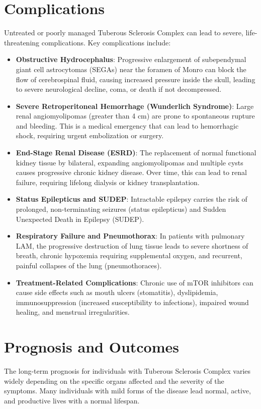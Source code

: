 \section*{Complications}
Untreated or poorly managed Tuberous Sclerosis Complex can lead to severe, life-threatening complications. Key complications include:
\begin{itemize}
    \item \textbf{Obstructive Hydrocephalus}: Progressive enlargement of subependymal giant cell astrocytomas (SEGAs) near the foramen of Monro can block the flow of cerebrospinal fluid, causing increased pressure inside the skull, leading to severe neurological decline, coma, or death if not decompressed.
    \item \textbf{Severe Retroperitoneal Hemorrhage (Wunderlich Syndrome)}: Large renal angiomyolipomas (greater than 4 cm) are prone to spontaneous rupture and bleeding. This is a medical emergency that can lead to hemorrhagic shock, requiring urgent embolization or surgery.
    \item \textbf{End-Stage Renal Disease (ESRD)}: The replacement of normal functional kidney tissue by bilateral, expanding angiomyolipomas and multiple cysts causes progressive chronic kidney disease. Over time, this can lead to renal failure, requiring lifelong dialysis or kidney transplantation.
    \item \textbf{Status Epilepticus and SUDEP}: Intractable epilepsy carries the risk of prolonged, non-terminating seizures (status epilepticus) and Sudden Unexpected Death in Epilepsy (SUDEP).
    \item \textbf{Respiratory Failure and Pneumothorax}: In patients with pulmonary LAM, the progressive destruction of lung tissue leads to severe shortness of breath, chronic hypoxemia requiring supplemental oxygen, and recurrent, painful collapses of the lung (pneumothoraces).
    \item \textbf{Treatment-Related Complications}: Chronic use of mTOR inhibitors can cause side effects such as mouth ulcers (stomatitis), dyslipidemia, immunosuppression (increased susceptibility to infections), impaired wound healing, and menstrual irregularities.
\end{itemize}

\section*{Prognosis and Outcomes}
The long-term prognosis for individuals with Tuberous Sclerosis Complex varies widely depending on the specific organs affected and the severity of the symptoms. Many individuals with mild forms of the disease lead normal, active, and productive lives with a normal lifespan.

